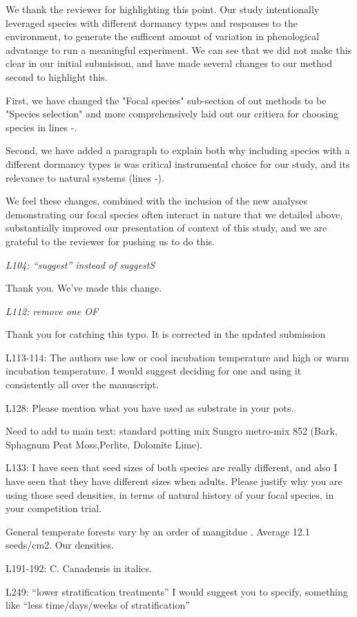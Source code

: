 \documentclass[11pt]{article}
\begin{document}
We thank the reviewer for highlighting this point. Our study intentionally leveraged species with different dormancy types and responses to the environment, to generate the sufficent amount of variation in phenological advatange to run a meaningful experiment. We can see that we did not make this clear in our initial submisison, and have made several changes to our method second to highlight this.

First, we have changed the "Focal species" sub-section of out methods to be "Species selection" and more comprehensively laid out our critiera for choosing species in lines -.

Second, we have added a paragraph to explain both why including species with a different dormancy types is was critical instrumental choice for our study, and its relevance to natural systems (lines -).

We feel these changes, combined with the inclusion of the new analyses demonstrating our focal species often interact in nature that we detailed above, substantially improved our presentation of context of this study, and we are grateful to the reviewer for pushing us to do this.

\emph{L104: “suggest” instead of suggestS}

Thank you. We've made this change.

\emph{L112: remove one OF}

Thank you for catching this typo. It is corrected in the updated submission

L113-114: The authors use low or cool incubation temperature and high or warm incubation temperature. I would suggest deciding for one and using it consistently all over the manuscript.

L128: Please mention what you have used as substrate in your pots.

Need to add to main text: standard potting mix Sungro metro-mix 852 (Bark, Sphagnum Peat Moss,Perlite, Dolomite Lime).

L133: I have seen that seed sizes of both species are really different, and also I have seen that they have different sizes when adults. Please justify why you are using those seed densities, in terms of natural history of your focal species, in your competition trial.

General temperate forests vary by an order of mangitdue \citep{Leckie:2000t,Bossuyt:2002un,Decocq:2004tq}. Average 12.1 seeds/cm2. Our densities.

L191-192: C. Canadensis in italics.

L249: “lower stratification treatments” I would suggest you to specify, something like “less time/days/weeks of stratification”
\end{document}
